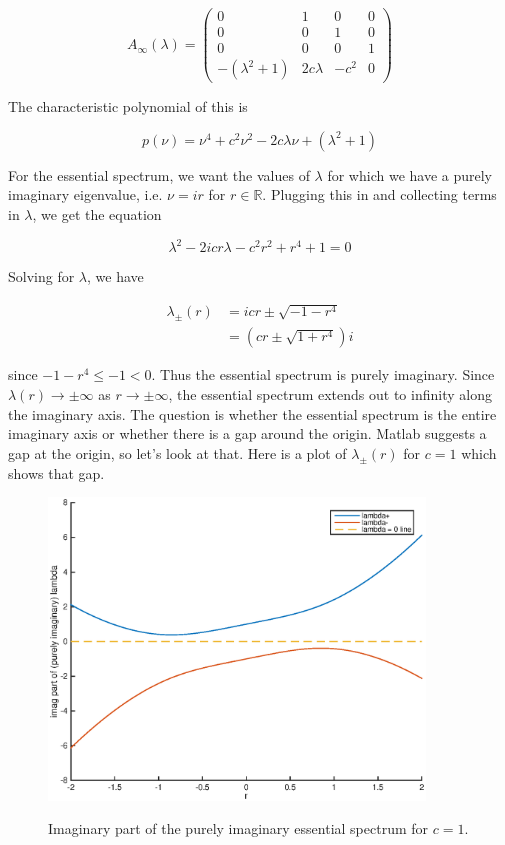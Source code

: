 \documentclass[12pt]{article}
\def\R{{\mathbb R}}
\begin{document}
\begin{equation*}
A_\infty(\lambda) = \begin{pmatrix}
0 & 1 & 0 & 0 \\
0 & 0 & 1 & 0 \\
0 & 0 & 0 & 1 \\
-(\lambda^2 + 1) & 2 c \lambda & -c^2 & 0 
\end{pmatrix}
\end{equation*}

The characteristic polynomial of this is 

\begin{equation}\label{charpoly}
p(\nu) = \nu^4 + c^2 \nu^2 - 2 c \lambda \nu + (\lambda^2 + 1) 
\end{equation} 

For the essential spectrum, we want the values of $\lambda$ for which we have a purely imaginary eigenvalue, i.e. $\nu = i r$ for $r \in \R$. Plugging this in and collecting terms in $\lambda$, we get the equation

\begin{equation}\label{fredholmborder}
\lambda^2 - 2 i c r \lambda - c^2 r^2  + r^4 + 1 = 0 
\end{equation} 

Solving for $\lambda$, we have

\begin{align*}
\lambda_\pm(r) &= i c r \pm \sqrt{-1 - r^4} \\
&= \left( c r \pm \sqrt{1 + r^4} \right) i
\end{align*}

since $-1 - r^4 \leq -1 < 0$. Thus the essential spectrum is purely imaginary. Since $\lambda(r) \rightarrow \pm \infty$ as $r \rightarrow \pm \infty$, the essential spectrum extends out to infinity along the imaginary axis. The question is whether the essential spectrum is the entire imaginary axis or whether there is a gap around the origin. Matlab suggests a gap at the origin, so let's look at that. Here is a plot of $\lambda_\pm(r)$ for $c = 1$ which shows that gap.

\begin{figure}[H]
\centering
\includegraphics[width=10cm]{essspec1.eps}
\label{fig:essspec1}
\caption{Imaginary part of the purely imaginary essential spectrum for $c = 1$.}
\end{figure}
\end{document}
